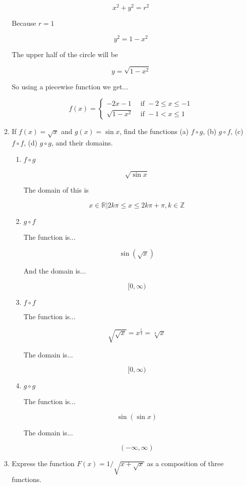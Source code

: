 \documentclass{article}
\begin{document}
\begin{enumerate}
		$$x^2 + y^2 = r^2$$

		Because $r = 1$

		$$y^2 = 1 - x^2$$

		The upper half of the circle will be

		$$y = \sqrt{1 - x^2}$$

		So using a piecewise function we get...

		$$f(x) = \begin{cases}
			-2x - 1 & \text{ if } -2 \leq x \leq -1 \\
			\sqrt{1 - x^2} & \text{ if } -1 < x \leq 1
		\end{cases}
		$$

	\item If $f(x) = \sqrt{x}$ and $g(x) = \sin x$, find the functions (a)
		$f \circ g$, (b) $g \circ f$, (c) $f \circ f$, (d) $g \circ g$,
		and their domains.

		\begin{enumerate}
			\item $f \circ g$

				$$\sqrt{\sin x}$$

				The domain of this is 

				$${x \in \mathbb{R} | 2k\pi \leq x \leq 2k\pi + \pi, k \in \mathbb{Z}}$$	

			\item $g \circ f$

				The function is...

				$$\sin (\sqrt{x})$$

				And the domain is...

				$$[0, \infty)$$

			\item $f \circ f$

				The function is...

				$$\sqrt{\sqrt{x}} = x^{\frac{1}{4}} = \sqrt[4]{x}$$

				The domain is...

				$$[0, \infty)$$

			\item $g \circ g$

				The function is...

				$$\sin (\sin x)$$

				The domain is...

				$$(-\infty, \infty)$$
		\end{enumerate}

		\item Express the function $F(x) = 1/\sqrt{x + \sqrt{x}}$ as a composition
			of three functions.


\end{enumerate}
\end{document}
